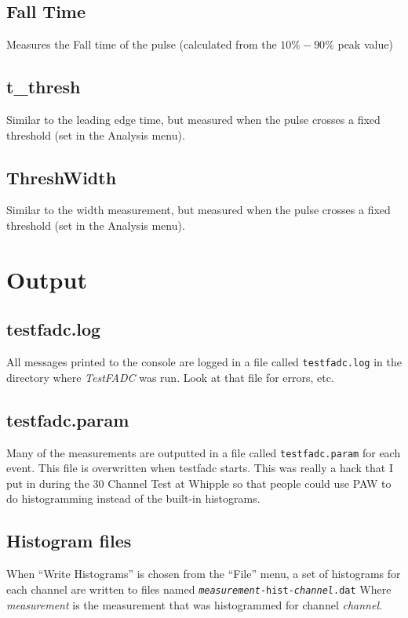\documentclass{article}
\newcommand{\F}[1]{\texttt{#1}}
\newcommand{\testfadc}{\emph{TestFADC} }
\begin{document}
\subsection{Fall Time}
Measures the Fall time of the pulse (calculated from the $10\% - 90\%$
peak value)

\subsection{t\_thresh}
Similar to the leading edge time, but measured when the pulse crosses
a fixed threshold (set in the Analysis menu).

\subsection{ThreshWidth}
Similar to the width measurement, but measured when the pulse crosses
a fixed threshold (set in the Analysis menu).

\section{Output}

\subsection{testfadc.log}
All messages printed to the console are logged in a file called
\F{testfadc.log} in the directory where \testfadc was run. Look at
that file for errors, etc.

\subsection{testfadc.param}
Many of the measurements are outputted in a file called
\F{testfadc.param} for each event.  This file is overwritten when
testfadc starts.  This was really a hack that I put in during the 30
Channel Test at Whipple so that people could use PAW to do
histogramming instead of the built-in histograms.

\subsection{Histogram files}

When ``Write Histograms'' is chosen from the ``File'' menu, a set of
histograms for each channel are written to files named
\F{\emph{measurement}-hist-\emph{channel}.dat}  Where
\emph{measurement} is the measurement that was histogrammed for
channel \emph{channel}.  
\end{document}
